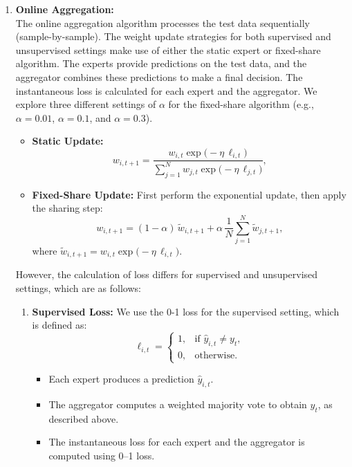 \documentclass{article}
\begin{document}
\begin{enumerate}
    \item \textbf{Online Aggregation:}\\
    The online aggregation algorithm processes the test data sequentially (sample-by-sample). The weight update strategies for both supervised and unsupervised settings make use of either the static expert or fixed-share algorithm. The experts provide predictions on the test data, and the aggregator combines these predictions to make a final decision. The instantaneous loss is calculated for each expert and the aggregator. We explore three different settings of $\alpha$ for the fixed-share algorithm (e.g., $\alpha = 0.01$, $\alpha = 0.1$, and $\alpha = 0.3$).
    \begin{itemize}
        \item \textbf{Static Update:} 
        \[
        w_{i,t+1} = \frac{w_{i,t} \exp\bigl(-\eta\,\ell_{i,t}\bigr)}{\sum_{j=1}^{N} w_{j,t} \exp\bigl(-\eta\,\ell_{j,t}\bigr)},
        \]
        \item \textbf{Fixed-Share Update:} First perform the exponential update, then apply the sharing step:
        \[
        w_{i,t+1} = (1-\alpha) \, \tilde{w}_{i,t+1} + \alpha \, \frac{1}{N} \sum_{j=1}^{N} \tilde{w}_{j,t+1},
        \]
        where $\tilde{w}_{i,t+1} = w_{i,t} \exp\bigl(-\eta\,\ell_{i,t}\bigr)$.
    \end{itemize}
    However, the calculation of loss differs for supervised and unsupervised settings, which are as follows:
    \begin{enumerate}
      \item \textbf{Supervised Loss:} We use the 0-1 loss for the supervised setting, which is defined as:
      \[
      \ell_{i,t} = \begin{cases}
      1, & \text{if } \hat{y}_{i,t} \neq y_t, \\
      0, & \text{otherwise.}
      \end{cases}
      \]
      \begin{itemize}
        \item Each expert produces a prediction $\hat{y}_{i,t}$.
        \item The aggregator computes a weighted majority vote to obtain $\hat{y}_t$, as described above.
        \item The instantaneous loss for each expert and the aggregator is computed using 0--1 loss.
      \end{itemize}
      

\end{enumerate}
\end{enumerate}
\end{document}
